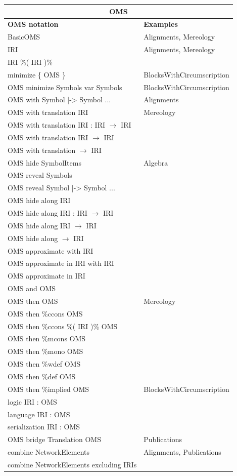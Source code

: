 \documentclass[10pt,%
\ifpretendfinal
final%
\else
draft%
\fi,
]{scrreprt}
\begin{document}
\begin{tabular}{|l|l|}\hline
\multicolumn{2}{|c|}{\textbf{OMS}}\\\hline
\textbf{OMS notation} & \textbf{Examples} \\\hline
BasicOMS  & Alignments, Mereology \\\hline
IRI  & Alignments, Mereology \\\hline
IRI \%( IRI )\%  &  \\\hline
minimize \{ OMS \}  & BlocksWithCircumscription \\\hline
OMS minimize Symbols var Symbols  & BlocksWithCircumscription \\\hline
OMS with Symbol |-> Symbol ...  & Alignments \\\hline
OMS with translation IRI  & Mereology \\\hline
OMS with translation IRI : IRI $\to$ IRI  &  \\\hline
OMS with translation IRI $\to$ IRI  &  \\\hline
OMS with translation $\to$ IRI  &  \\\hline
OMS hide SymbolItems  &  Algebra \\\hline
OMS reveal Symbols  &  \\\hline
OMS reveal Symbol |-> Symbol ...  &  \\\hline
OMS hide along IRI  &  \\\hline
OMS hide along IRI : IRI $\to$ IRI  &  \\\hline
OMS hide along IRI $\to$ IRI  &  \\\hline
OMS hide along $\to$ IRI  &  \\\hline
OMS approximate with IRI   &  \\\hline
OMS approximate in IRI with IRI   &  \\\hline
OMS approximate in IRI  &  \\\hline
OMS and OMS   &  \\\hline
OMS then OMS  & Mereology \\\hline
OMS then \%ccons OMS  &  \\\hline
OMS then \%ccons \%( IRI )\% OMS  &  \\\hline
OMS then \%mcons OMS  &  \\\hline
OMS then \%mono OMS  &  \\\hline
OMS then \%wdef OMS  &  \\\hline
OMS then \%def OMS  &  \\\hline
OMS then \%implied OMS  &  BlocksWithCircumscription \\\hline
logic IRI : OMS  &  \\\hline
language IRI : OMS  &  \\\hline
serialization IRI : OMS  &  \\\hline
OMS bridge Translation OMS  & Publications \\\hline
combine NetworkElements  & Alignments, Publications \\\hline
combine NetworkElements excluding IRIs  &  \\\hline
\end{tabular}
\end{document}
